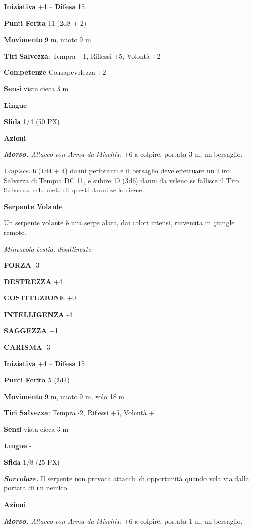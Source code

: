 \begin{multicols}{2}
	\textbf{Iniziativa} +4 -- \textbf{Difesa} 15

	\textbf{Punti Ferita} 11 (2d8 + 2)

	\textbf{Movimento} 9 m, nuoto 9 m

	\textbf{Tiri Salvezza}: Tempra +1, Riflessi +5, Volontà +2

	\textbf{Competenze} Consapevolezza +2

	\textbf{Sensi} vista cieca 3 m

	\textbf{Lingue} -

	\textbf{Sfida} 1/4 (50 PX)

	\textbf{Azioni}

	\textit{\textbf{Morso.} Attacco con Arma da Mischia}: +6 a colpire, portata 3 m, un bersaglio.

	\textit{Colpisce:} 6 (1d4 + 4) danni perforanti e il bersaglio deve effettuare un Tiro Salvezza di Tempra DC 11, e subire 10 (3d6) danni da veleno se fallisce il Tiro Salvezza, o la metà di questi danni se lo riesce.

	\medskip\textbf{Serpente Volante}

	Un serpente volante è una serpe alata, dai colori intensi, rinvenuta in giungle remote.

	\textit{Minuscola bestia, disallineato}

	\textbf{FORZA} -3

	\textbf{DESTREZZA} +4

	\textbf{COSTITUZIONE} +0

	\textbf{INTELLIGENZA} -4

	\textbf{SAGGEZZA} +1

	\textbf{CARISMA} -3

	\textbf{Iniziativa} +4 -- \textbf{Difesa} 15

	\textbf{Punti Ferita} 5 (2d4)

	\textbf{Movimento} 9 m, nuoto 9 m, volo 18 m

	\textbf{Tiri Salvezza}: Tempra -2, Riflessi +5, Volontà +1

	\textbf{Sensi} vista cieca 3 m

	\textbf{Lingue} -

	\textbf{Sfida} 1/8 (25 PX)

	\textit{\textbf{Sorvolare.}} Il serpente non provoca attacchi di opportunità quando vola via dalla portata di un nemico.

	\textbf{Azioni}

	\textit{\textbf{Morso.} Attacco con Arma da Mischia}: +6 a colpire, portata 1 m, un bersaglio.


\end{multicols}
